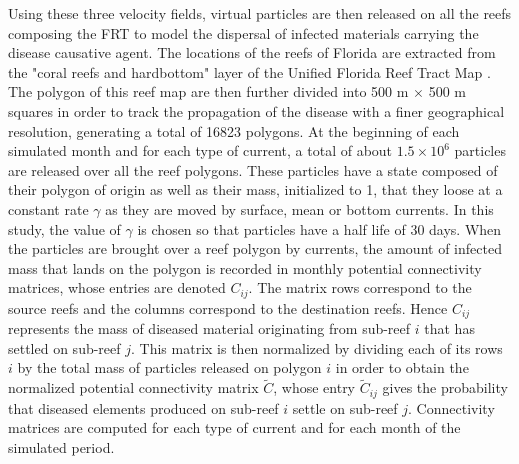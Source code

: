 \documentclass[utf8]{frontiersSCNS}
\begin{document}
Using these three velocity fields, virtual particles are then released on all the reefs composing the FRT to model the dispersal of infected materials carrying the disease causative agent. The locations of the reefs of Florida are extracted from the "coral reefs and hardbottom" layer of the Unified Florida Reef Tract Map \citep{fwc2017unified}. The polygon of this reef map are then further divided into 500 m $\times$ 500 m squares in order to track the propagation of the disease with a finer geographical resolution, generating a total of 16823 polygons. At the beginning of each simulated month and for each type of current, a total of about $1.5 \times 10^6$ particles are released over all the reef polygons. These particles have a state composed of their polygon of origin as well as their mass, initialized to 1, that they loose at a constant rate $\gamma$ as they are moved by surface, mean or bottom currents. In this study, the value of $\gamma$ is chosen so that particles have a half life of 30 days. When the particles are brought over a reef polygon by currents, the amount of infected mass that lands on the polygon is recorded in monthly potential connectivity matrices, whose entries are denoted $C_{ij}$. The matrix rows correspond to the source reefs and the columns correspond to the destination reefs. Hence $C_{ij}$ represents the mass of diseased material originating from sub-reef $i$ that has settled on sub-reef $j$. This matrix is then normalized by dividing each of its rows $i$ by the total mass of particles released on polygon $i$ in order to obtain the normalized potential connectivity matrix $\tilde{C}$, whose entry $\tilde{C}_{ij}$ gives the probability that diseased elements produced on sub-reef $i$ settle on sub-reef $j$. Connectivity matrices are computed for each type of current and for each month of the simulated period.
\end{document}
